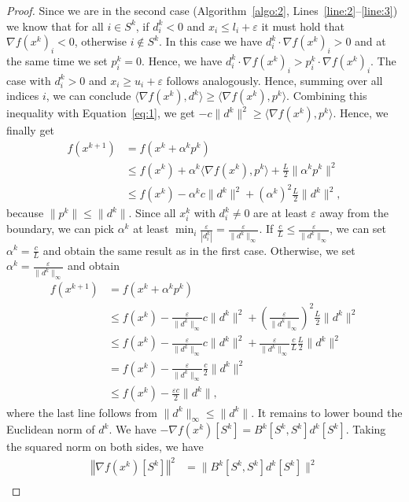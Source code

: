 \documentclass[letterpaper]{article} %
\newcommand{\vareps}{\varepsilon}
\newcommand{\sprod}[2]{\langle{#1}, {#2}\rangle}
\newcommand{\norm}[1]{\left\Vert#1\right\Vert}
\begin{document}
\begin{proof}
Since we are in the second case (Algorithm~\ref{algo:2}, Lines~\ref{line:2}--\ref{line:3}) we know that for all $i\in S^k$, if $d^k_i < 0$ and $x_i\leq l_i +\vareps$ it must hold that $\nabla f(x^k)_i < 0$,  otherwise $i\notin S^k$. In this case we have $d^k_i \cdot \nabla f(x^k)_i > 0$ and at the same time we set $p^k_i=0$. Hence, we have $d^k_i \cdot \nabla f(x^k)_i > p^k_i \cdot \nabla f(x^k)_i$. The case with $d^k_i > 0$ and $x_i\geq u_i +\vareps$ follows analogously. Hence, summing over all indices $i$, we can conclude $\sprod{\nabla f(x^k)}{d^k}\geq \sprod{\nabla f(x^k)}{p^k}$. Combining this inequality with Equation~\eqref{eq:1}, we get $-c\|d^k\|^2\geq\sprod{\nabla f(x^k)}{p^k}$.
Hence, we finally get
\begin{align*}
f(x^{k+1}) & = f(x^k+\alpha^kp^k) \\
& \leq f(x^k) + \alpha^k\sprod{\nabla f(x^k)}{p^k} + \frac{L}{2}\|\alpha^k p^k\|^2  \\
& \leq f(x^k) - \alpha^k c\|d^k\|^2 + (\alpha^k)^2 \frac{L}{2}\|d^k\|^2,
\end{align*}
because $\|p^k\| \leq \|d^k\|$.
Since all $x^k_i$ with $d^k_i\neq 0$ are at least $\vareps$ away from the boundary, we can pick $\alpha^k$ at least $\min_i \frac{\vareps}{|d^k_i|}=\frac{\vareps}{\|d^k\|_\infty}$.
If $\frac{c}{L}\leq \frac{\vareps}{\|d^k\|_\infty}$, we can set $\alpha^k=\frac{c}{L}$ and obtain the same result as in the first case. Otherwise, we set $\alpha^k=\frac{\vareps}{\|d^k\|_\infty}$ and obtain
\[
\begin{split}
f(x^{k+1}) & = f(x^k+\alpha^kp^k) \\ %
&\leq f(x^k) - \frac{\vareps}{\|d^k\|_\infty} c\|d^k\|^2 + \left(\frac{\vareps}{\|d^k\|_\infty}\right)^2\frac{L}{2}\|d^k\|^2 \\
& \leq f(x^k) - \frac{\vareps}{\|d^k\|_\infty} c\|d^k\|^2 + \frac{\vareps}{\|d^k\|_\infty}\frac{c}{L}\frac{L}{2}\|d^k\|^2 \\
&= f(x^k) - \frac{\vareps}{\|d^k\|_\infty}\frac{c}{2}\|d^k\|^2 \\
& \leq f(x^k) - \frac{\vareps c}{2}\|d^k\|,
\end{split}
\]
where the last line follows from $\|d^k\|_\infty \leq \|d^k\|$.
It remains to lower bound the Euclidean norm of $d^k$.  
We have $-\nabla f(x^k)[S^k]=B^k[S^k, S^k] d^k[S^k]$. Taking the squared norm on both sides, we have 
\[
\begin{split}
\norm{\nabla f(x^k)[S^k]}^2  & = \|B^k[S^k, S^k] d^k[S^k]\|^2 \\

\end{split}\]
\end{proof}
\end{document}

